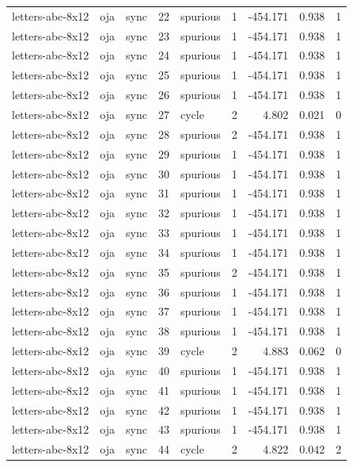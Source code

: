 \begin{tabular}{lllrlrrrr}
letters-abc-8x12 & oja & sync & 22 & spurious & 1 & -454.171 & 0.938 & 1 \\
letters-abc-8x12 & oja & sync & 23 & spurious & 1 & -454.171 & 0.938 & 1 \\
letters-abc-8x12 & oja & sync & 24 & spurious & 1 & -454.171 & 0.938 & 1 \\
letters-abc-8x12 & oja & sync & 25 & spurious & 1 & -454.171 & 0.938 & 1 \\
letters-abc-8x12 & oja & sync & 26 & spurious & 1 & -454.171 & 0.938 & 1 \\
letters-abc-8x12 & oja & sync & 27 & cycle & 2 & 4.802 & 0.021 & 0 \\
letters-abc-8x12 & oja & sync & 28 & spurious & 2 & -454.171 & 0.938 & 1 \\
letters-abc-8x12 & oja & sync & 29 & spurious & 1 & -454.171 & 0.938 & 1 \\
letters-abc-8x12 & oja & sync & 30 & spurious & 1 & -454.171 & 0.938 & 1 \\
letters-abc-8x12 & oja & sync & 31 & spurious & 1 & -454.171 & 0.938 & 1 \\
letters-abc-8x12 & oja & sync & 32 & spurious & 1 & -454.171 & 0.938 & 1 \\
letters-abc-8x12 & oja & sync & 33 & spurious & 1 & -454.171 & 0.938 & 1 \\
letters-abc-8x12 & oja & sync & 34 & spurious & 1 & -454.171 & 0.938 & 1 \\
letters-abc-8x12 & oja & sync & 35 & spurious & 2 & -454.171 & 0.938 & 1 \\
letters-abc-8x12 & oja & sync & 36 & spurious & 1 & -454.171 & 0.938 & 1 \\
letters-abc-8x12 & oja & sync & 37 & spurious & 1 & -454.171 & 0.938 & 1 \\
letters-abc-8x12 & oja & sync & 38 & spurious & 1 & -454.171 & 0.938 & 1 \\
letters-abc-8x12 & oja & sync & 39 & cycle & 2 & 4.883 & 0.062 & 0 \\
letters-abc-8x12 & oja & sync & 40 & spurious & 1 & -454.171 & 0.938 & 1 \\
letters-abc-8x12 & oja & sync & 41 & spurious & 1 & -454.171 & 0.938 & 1 \\
letters-abc-8x12 & oja & sync & 42 & spurious & 1 & -454.171 & 0.938 & 1 \\
letters-abc-8x12 & oja & sync & 43 & spurious & 1 & -454.171 & 0.938 & 1 \\
letters-abc-8x12 & oja & sync & 44 & cycle & 2 & 4.822 & 0.042 & 2 \\

\end{tabular}
